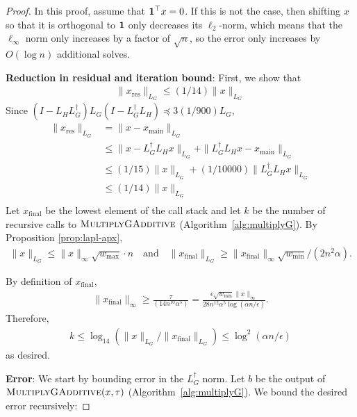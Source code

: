 \begin{proof}
In this proof, assume that ${\bf 1}^{\top}x = 0$. If this is not the case, then shifting $x$ so that it is orthogonal to ${\bf 1}$ only decreases its $\ell_2$-norm, which means that the $\ell_{\infty}$ norm only increases by a factor of $\sqrt{n}$, so the error only increases by $O(\log n)$ additional solves.

{\bf Reduction in residual and iteration bound}: First, we show that
\begin{align*}
\|x_{\text{res}}\|_{L_G}\le (1/14) \|x\|_{L_G}
\end{align*}
Since $(I - L_H L_G^{\dag})L_G(I - L_G^{\dag}L_H)\preceq 3(1/900) L_G$,
\begin{align*}
\|x_{\text{res}}\|_{L_G} &= \|x - x_{\text{main}}\|_{L_G}\\
&\le \|x - L_G^{\dag}L_H x\|_{L_G} + \|L_G^{\dag}L_H x - x_{\text{main}}\|_{L_G}\\
&\le (1/15) \|x\|_{L_G} + (1/10000) \|L_G^{\dag}L_H x\|_{L_G}\\
&\le (1/14) \|x\|_{L_G}\\ 
\end{align*}
Let $x_{\text{final}}$ be the lowest element of the call stack and let $k$ be the number of recursive calls to $\textsc{MultiplyGAdditive}$ (Algorithm~\ref{alg:multiplyG}). By Proposition \ref{prop:lapl-apx},
\begin{align*}
    \|x\|_{L_G}\le \|x\|_{\infty} \sqrt{w_{\max}} \cdot n
    \text{~~~and~~~} \|x_{\text{final}}\|_{L_G}\ge \|x_{\text{final}}\|_{\infty} \sqrt{w_{\min}}/(2n^2\alpha).
\end{align*}

By definition of $x_{\text{final}}$, 
\begin{align*}\|x_{\text{final}}\|_{\infty}
\ge \frac{\tau}{ (14 n^{10}\alpha^5) } = \frac{\epsilon \sqrt{w_{\min}} \|x\|_{\infty}}{ 28 n^{12}\alpha^5 \log(\alpha n/\epsilon)}.
\end{align*}
Therefore,
\begin{align*}
k\le \log_{14}(\|x\|_{L_G}/\|x_{\text{final}}\|_{L_G}) \le \log^2 (\alpha n/\epsilon)
\end{align*}
as desired.

\textbf{Error}: We start by bounding error in the $L_G^{\dag}$ norm. Let $b$ be the output of $\textsc{MultiplyGAdditive}(x,\tau)$ (Algorithm~\ref{alg:multiplyG}). We bound the desired error recursively:


\end{proof}
